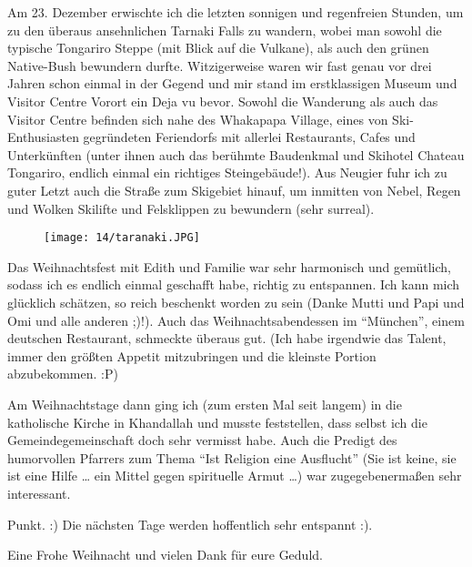 Am 23. Dezember erwischte ich die letzten sonnigen und regenfreien
Stunden, um zu den überaus ansehnlichen Tarnaki Falls zu wandern, wobei
man sowohl die typische Tongariro Steppe (mit Blick auf die Vulkane),
als auch den grünen Native-Bush bewundern durfte. Witzigerweise waren
wir fast genau vor drei Jahren schon einmal in der Gegend und mir stand
im erstklassigen Museum und Visitor Centre Vorort ein Deja vu bevor.
Sowohl die Wanderung als auch das Visitor Centre befinden sich nahe des
Whakapapa Village, eines von Ski-Enthusiasten gegründeten Feriendorfs
mit allerlei Restaurants, Cafes und Unterkünften (unter ihnen auch das
berühmte Baudenkmal und Skihotel Chateau Tongariro, endlich einmal ein
richtiges Steingebäude!). Aus Neugier fuhr ich zu guter Letzt auch die
Straße zum Skigebiet hinauf, um inmitten von Nebel, Regen und Wolken
Skilifte und Felsklippen zu bewundern (sehr surreal).
\begin{figure}[h]
  \centering
  \texttt{[image: 14/taranaki.JPG]}
\end{figure}

Das Weihnachtsfest mit Edith und Familie war sehr harmonisch und
gemütlich, sodass ich es endlich einmal geschafft habe, richtig zu
entspannen. Ich kann mich glücklich schätzen, so reich beschenkt worden
zu sein (Danke Mutti und Papi und Omi und alle anderen ;)!). Auch das
Weihnachtsabendessen im ``München'', einem deutschen Restaurant, schmeckte
überaus gut. (Ich habe irgendwie das Talent, immer den größten Appetit
mitzubringen und die kleinste Portion abzubekommen. :P)

Am Weihnachtstage dann ging ich (zum ersten Mal seit langem) in die
katholische Kirche in Khandallah und musste feststellen, dass selbst ich
die Gemeindegemeinschaft doch sehr vermisst habe. Auch die Predigt des
humorvollen Pfarrers zum Thema ``Ist Religion eine Ausflucht'' (Sie ist
keine, sie ist eine Hilfe \ldots{} ein Mittel gegen spirituelle Armut
\ldots) war zugegebenermaßen sehr interessant.

Punkt. :) Die nächsten Tage werden hoffentlich sehr entspannt :).

Eine Frohe Weihnacht und vielen Dank für eure Geduld.
